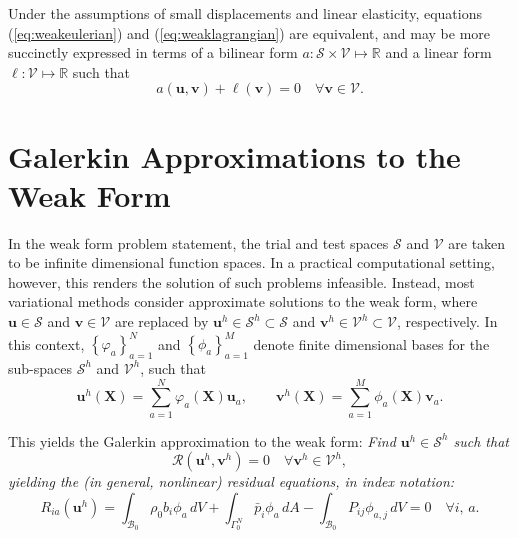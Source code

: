 Under the assumptions of small displacements and linear elasticity, equations (\ref{eq:weakeulerian}) and (\ref{eq:weaklagrangian}) are equivalent, and may be more succinctly expressed in terms of a bilinear form $a \colon \mathcal{S} \times \mathcal{V} \mapsto \mathbb{R}$ and a linear form $\ell : \mathcal{V} \mapsto \mathbb{R}$ such that
\begin{equation}
  a(\mathbf{u}, \mathbf{v}) + \ell (\mathbf{v}) = 0 \quad \forall \mathbf{v} \in \mathcal{V}.
\end{equation}


\section{Galerkin Approximations to the Weak Form}

In the weak form problem statement, the trial and test spaces $\mathcal{S}$ and $\mathcal{V}$ are taken to be infinite dimensional function spaces. In a practical computational setting, however, this renders the solution of such problems infeasible. Instead, most variational methods consider approximate solutions to the weak form, where $\mathbf{u} \in \mathcal{S}$ and $\mathbf{v} \in \mathcal{V}$ are replaced by $\mathbf{u}^h \in \mathcal{S}^h \subset \mathcal{S}$ and $\mathbf{v}^h \in \mathcal{V}^h \subset \mathcal{V}$, respectively. In this context, $\left\{ \varphi_a \right\}_{a = 1}^{N}$ and $\left\{ \phi_a \right\}_{a = 1}^{M}$ denote finite dimensional bases for the sub-spaces $\mathcal{S}^h$ and $\mathcal{V}^h$, such that
\begin{equation}
  \mathbf{u}^h (\mathbf{X}) = \sum_{a = 1}^N \varphi_a (\mathbf{X}) \mathbf{u}_a, \qquad \mathbf{v}^h (\mathbf{X}) = \sum_{a = 1}^M \phi_a (\mathbf{X}) \mathbf{v}_a.
\end{equation}

This yields the Galerkin approximation to the weak form:
\textit{Find $\mathbf{u}^h \in \mathcal{S}^h$ such that}
\begin{equation}
  \mathcal{R}(\mathbf{u}^h, \mathbf{v}^h) = 0 \quad \forall \mathbf{v}^h \in \mathcal{V}^h,
  \label{eq:weakform}
\end{equation}
\textit{yielding the (in general, nonlinear) residual equations, in index notation:}
\begin{equation}
  R_{ia} (\mathbf{u}^h) = \int_{\mathcal{B}_0} \rho_0 b_i \phi_a \, dV + \int_{\Gamma^N_0} \bar{p}_i \phi_a \, dA - \int_{\mathcal{B}_0} P_{ij} \phi_{a,j} \, dV = 0 \quad \forall i, \, a.
  \label{eq:residual}
\end{equation}

